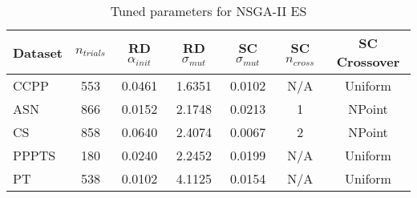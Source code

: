 \begin{table}[ht]
\centering
\caption{Tuned parameters for NSGA-II ES}
\begin{tabular}{lcccccc}
\hline
Dataset & $n_{trials}$ & \acs{RD} $\alpha_{init}$ & \acs{RD} $\sigma_{mut}$ & \acs{SC} $\sigma_{mut}$ & \acs{SC} $n_{cross}$ & \acs{SC} Crossover \\
\hline
CCPP & 553 & 0.0461 & 1.6351 & 0.0102 & N/A & Uniform \\
ASN & 866 & 0.0152 & 2.1748 & 0.0213 & 1 & NPoint \\
CS & 858 & 0.0640 & 2.4074 & 0.0067 & 2 & NPoint \\
PPPTS & 180 & 0.0240 & 2.2452 & 0.0199 & N/A & Uniform \\
PT & 538 & 0.0102 & 4.1125 & 0.0154 & N/A & Uniform \\
\hline
\end{tabular}
\end{table}